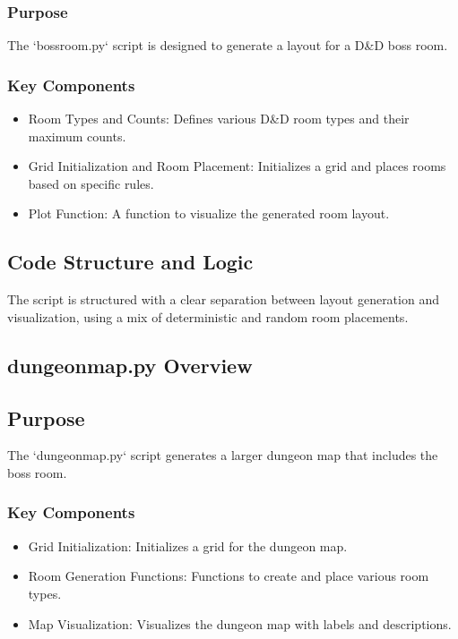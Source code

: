 \documentclass[10pt,twocolumn]{article}
\begin{document}
\subsubsection{Purpose}
The `bossroom.py` script is designed to generate a layout for a D\&D boss room. 

\subsubsection{Key Components}
\begin{itemize}
    \item Room Types and Counts: Defines various D\&D room types and their maximum counts.
    \item Grid Initialization and Room Placement: Initializes a grid and places rooms based on specific rules.
    \item Plot Function: A function to visualize the generated room layout.
\end{itemize}

\subsection{Code Structure and Logic}
The script is structured with a clear separation between layout generation and visualization, using a mix of deterministic and random room placements.

\subsection{dungeonmap.py Overview}
\subsection{Purpose}
The `dungeonmap.py` script generates a larger dungeon map that includes the boss room.

\subsubsection{Key Components}
\begin{itemize}
    \item Grid Initialization: Initializes a grid for the dungeon map.
    \item Room Generation Functions: Functions to create and place various room types.
    \item Map Visualization: Visualizes the dungeon map with labels and descriptions.
\end{itemize}
\end{document}
